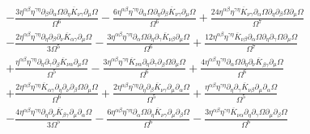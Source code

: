 \documentclass[10pt,letterpaper]{article}
\numberwithin{equation}{section}
\begin{document}
\begin{align}
& -  \frac{3 \eta^{\alpha \beta} \eta^{\gamma \eta} \partial_{\beta}\partial_{\alpha}\Omega \partial_{\eta}\overline{K}_{\nu \gamma} \partial_{\mu}\Omega}{\Omega^6} -  \frac{6 \eta^{\alpha \beta} \eta^{\gamma \eta} \partial_{\alpha}\Omega \partial_{\eta}\partial_{\beta}\overline{K}_{\nu \gamma} \partial_{\mu}\Omega}{\Omega^6} + \frac{24 \eta^{\alpha \beta} \eta^{\gamma \eta} \overline{K}_{\nu \gamma} \partial_{\alpha}\Omega \partial_{\eta}\partial_{\beta}\Omega \partial_{\mu}\Omega}{\Omega^7} \nonumber \\
&-  \frac{2 \eta^{\alpha \beta} \eta^{\gamma \eta} \partial_{\eta}\partial_{\beta}\partial_{\nu}\overline{K}_{\alpha \gamma} \partial_{\mu}\Omega}{3 \Omega^5} -  \frac{3 \eta^{\alpha \beta} \eta^{\gamma \eta} \partial_{\alpha}\Omega \partial_{\eta}\partial_{\gamma}\overline{K}_{\nu \beta} \partial_{\mu}\Omega}{\Omega^6} + \frac{12 \eta^{\alpha \beta} \eta^{\gamma \eta} \overline{K}_{\nu \beta} \partial_{\alpha}\Omega \partial_{\eta}\partial_{\gamma}\Omega \partial_{\mu}\Omega}{\Omega^7} \nonumber \\
&+ \frac{\eta^{\alpha \beta} \eta^{\gamma \eta} \partial_{\eta}\partial_{\gamma}\partial_{\beta}\overline{K}_{\nu \alpha} \partial_{\mu}\Omega}{\Omega^5} -  \frac{3 \eta^{\alpha \beta} \eta^{\gamma \eta} \overline{K}_{\nu \alpha} \partial_{\eta}\partial_{\gamma}\partial_{\beta}\Omega \partial_{\mu}\Omega}{\Omega^6} + \frac{4 \eta^{\alpha \beta} \eta^{\gamma \eta} \partial_{\alpha}\Omega \partial_{\eta}\partial_{\nu}\overline{K}_{\beta \gamma} \partial_{\mu}\Omega}{\Omega^6} \nonumber \\
&+ \frac{2 \eta^{\alpha \beta} \eta^{\gamma \eta} \overline{K}_{\alpha \gamma} \partial_{\eta}\partial_{\nu}\partial_{\beta}\Omega \partial_{\mu}\Omega}{\Omega^6} + \frac{2 \eta^{\alpha \beta} \eta^{\gamma \eta} \partial_{\eta}\partial_{\beta}\overline{K}_{\nu \gamma} \partial_{\mu}\partial_{\alpha}\Omega}{\Omega^5} + \frac{\eta^{\alpha \beta} \eta^{\gamma \eta} \partial_{\eta}\partial_{\gamma}\overline{K}_{\nu \beta} \partial_{\mu}\partial_{\alpha}\Omega}{\Omega^5} \nonumber \\
&-  \frac{4 \eta^{\alpha \beta} \eta^{\gamma \eta} \partial_{\eta}\partial_{\nu}\overline{K}_{\beta \gamma} \partial_{\mu}\partial_{\alpha}\Omega}{3 \Omega^5} -  \frac{6 \eta^{\alpha \beta} \eta^{\gamma \eta} \partial_{\alpha}\Omega \partial_{\eta}\overline{K}_{\nu \gamma} \partial_{\mu}\partial_{\beta}\Omega}{\Omega^6} -  \frac{3 \eta^{\alpha \beta} \eta^{\gamma \eta} \overline{K}_{\nu \alpha} \partial_{\eta}\partial_{\gamma}\Omega \partial_{\mu}\partial_{\beta}\Omega}{\Omega^6} \nonumber \\

\end{align}
\end{document}
